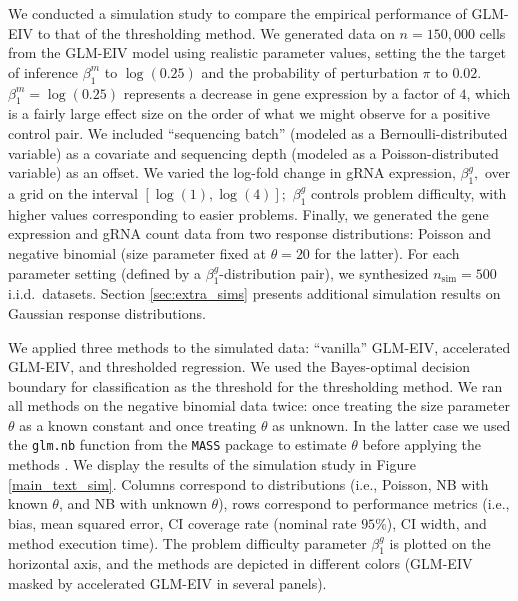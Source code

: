 \documentclass[12pt]{article}
\begin{document}
We conducted a simulation study to compare the empirical performance of GLM-EIV to that of the thresholding method. We generated data on $n = 150,000$ cells from the GLM-EIV model using realistic parameter values, setting the the target of inference $\beta^m_1$ to $\log(0.25)$ and the probability of perturbation $\pi$ to $0.02$. $\beta^m_1 = \log(0.25)$ represents a decrease in gene expression by a factor of $4$, which is a fairly large effect size on the order of what we might observe for a positive control pair. We included ``sequencing batch'' (modeled as a Bernoulli-distributed variable) as a covariate and sequencing depth (modeled as a Poisson-distributed variable) as an offset. We varied the log-fold change in gRNA expression, $\beta^g_1,$ over a grid on the interval $[\log(1), \log(4)];$ $\beta^g_1$ controls problem difficulty, with higher values corresponding to easier problems. Finally, we generated the gene expression and gRNA count data from two response distributions: Poisson and negative binomial (size parameter fixed at $\theta = 20$ for the latter). For each parameter setting (defined by a $\beta^g_1$-distribution pair), we synthesized $n_\textrm{sim} = 500$ i.i.d.\ datasets. Section \ref{sec:extra_sims} presents additional simulation results on Gaussian response distributions.

We applied three methods to the simulated data: ``vanilla'' GLM-EIV, accelerated GLM-EIV, and thresholded regression. We used the Bayes-optimal decision boundary for classification as the threshold for the thresholding method. We ran all methods on the negative binomial data twice: once treating the size parameter $\theta$ as a known constant and once treating $\theta$ as unknown. In the latter case we used the \texttt{glm.nb} function from the \texttt{MASS} package to estimate $\theta$ before applying the methods \cite{Ripley2013}. We display the results of the simulation study in Figure \ref{main_text_sim}. Columns correspond to distributions (i.e., Poisson, NB with known $\theta$, and NB with unknown $\theta$), rows correspond to performance metrics (i.e., bias, mean squared error, CI coverage rate (nominal rate $95\%$), CI width, and method execution time). The problem difficulty parameter $\beta^g_1$ is plotted on the horizontal axis, and the methods are depicted in different colors (GLM-EIV masked by accelerated GLM-EIV in several panels).
\end{document}

